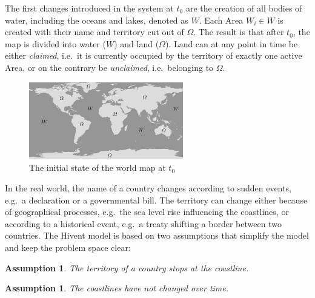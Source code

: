 The first changes introduced in the system at $t_0$ are the creation of all bodies of water, including the oceans and lakes, denoted as $W$. Each Area $W_i \in W$ is created with their name and territory cut out of $\Omega$. The result is that after $t_0$, the map is divided into water ($W$) and land ($\Omega$). Land can at any point in time be either \emph{claimed}, i.e.\ it is currently occupied by the territory of exactly one active Area, or on the contrary be \emph{unclaimed}, i.e.\ belonging to $\Omega$.

\begin{figure}[ht]
  \centering
  \includegraphics[width=0.6\textwidth]{graphics/development/hivent_model/init_map}
  \caption{The initial state of the world map at $t_0$}
  \label{fig:init_map}
\end{figure}

In the real world, the name of a country changes according to sudden events, e.g.\ a declaration or a governmental bill. The territory can change either because of geographical processes, e.g.\ the sea level rise influencing the coastlines, or according to a historical event, e.g.\ a treaty shifting a border between two countries. The Hivent model is based on two assumptions that simplify the model and keep the problem space clear:

\vspace{-0.0em}
\newtheorem{coastline_territory}[assicounter]{Assumption}
\begin{coastline_territory}
\label{axm:coastline_territory}
  The territory of a country stops at the coastline.
\end{coastline_territory}

\vspace{-1.5em}
\newtheorem{constant_coastlines}[assicounter]{Assumption}
\begin{constant_coastlines}
\label{axm:constant_coastlines}
  The coastlines have not changed over time.
\end{constant_coastlines}

